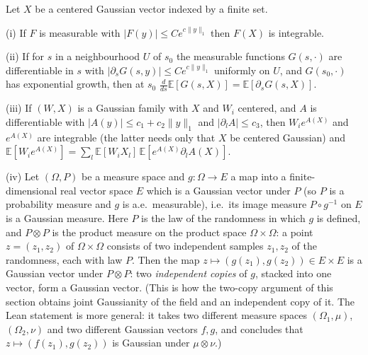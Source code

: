 \begin{lemma}\label{lem:sg:expgrowth}
  \leanok
Let $X$ be a centered Gaussian vector indexed by a finite set. 

(i) If $F$ is measurable with $|F(y)|\le Ce^{c\|y\|_1}$ then $F(X)$ is
integrable. 

(ii) If for $s$ in a neighbourhood $U$ of $s_0$ the measurable functions $G(s,\cdot)$ are differentiable in $s$ with
$|\partial_sG(s,y)|\le Ce^{c\|y\|_1}$ uniformly on $U$, and $G(s_0,\cdot)$ has exponential growth, then at $s_0$
$\frac{d}{ds}\mathbb E[G(s,X)]=\mathbb E[\partial_sG(s,X)]$. 

(iii) If $(W,X)$ is a Gaussian family with $X$ and $W_i$ centered, and $A$ is differentiable with
$|A(y)|\le c_1+c_2\|y\|_1$ and $|\partial_lA|\le c_3$, then $W_ie^{A(X)}$ and $e^{A(X)}$ are integrable (the latter
needs only that $X$ be centered Gaussian) and
$\mathbb E[W_ie^{A(X)}]=\sum_l\mathbb E[W_iX_l]\,\mathbb E[e^{A(X)}\partial_lA(X)]$. 

(iv) Let $(\Omega,P)$ be a measure space and $g:\Omega\to E$ a map into a finite-dimensional real vector space $E$ which is a Gaussian vector
under $P$ (so $P$ is a probability measure and $g$ is a.e.\ measurable), i.e.\ its image measure $P\circ g^{-1}$ on $E$ is a Gaussian measure. Here $P$ is the law of the randomness in which $g$ is defined, and $P\otimes P$ is the product measure on the product space
$\Omega\times\Omega$: a point $z=(z_1,z_2)$ of $\Omega\times\Omega$ consists of two independent samples $z_1,z_2$ of the randomness, each with law $P$. Then the map
$z\mapsto(g(z_1),g(z_2))\in E\times E$ is a Gaussian vector under $P\otimes P$: two \emph{independent copies} of $g$, stacked into one vector, form a Gaussian vector. (This is how the two-copy argument of this section
obtains joint Gaussianity of the field and an independent copy of it. The Lean statement is more general: it takes two different measure spaces $(\Omega_1,\mu)$, $(\Omega_2,\nu)$ and two different Gaussian vectors $f,g$,
and concludes that $z\mapsto(f(z_1),g(z_2))$ is Gaussian under $\mu\otimes\nu$.)
\end{lemma}

